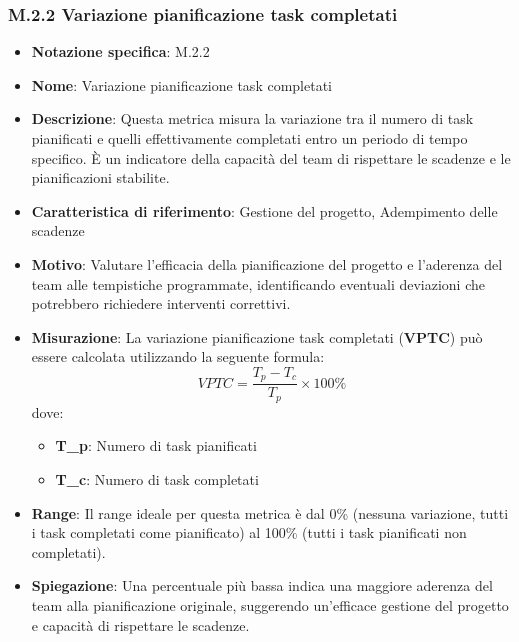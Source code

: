 \subsubsection{M.2.2 Variazione pianificazione task completati}
\begin{itemize}
    \item \textbf{Notazione specifica}: M.2.2
    \item \textbf{Nome}: Variazione pianificazione task completati
    \item \textbf{Descrizione}: Questa metrica misura la variazione tra il numero di task pianificati e quelli effettivamente completati entro un periodo di tempo specifico. È un indicatore della capacità del team di rispettare le scadenze e le pianificazioni stabilite.
    \item \textbf{Caratteristica di riferimento}: Gestione del progetto, Adempimento delle scadenze
    \item \textbf{Motivo}: Valutare l'efficacia della pianificazione del progetto e l'aderenza del team alle tempistiche programmate, identificando eventuali deviazioni che potrebbero richiedere interventi correttivi.
    \item \textbf{Misurazione}: La variazione pianificazione task completati (\textbf{VPTC}) può essere calcolata utilizzando la seguente formula:
    \[ VPTC = \frac{T_p - T_c}{T_p} \times 100\% \]
    dove:
    \begin{itemize}
        \item \textbf{T_p}: Numero di task pianificati
        \item \textbf{T_c}: Numero di task completati
    \end{itemize}
    \item \textbf{Range}: Il range ideale per questa metrica è dal 0\% (nessuna variazione, tutti i task completati come pianificato) al 100\% (tutti i task pianificati non completati).
    \item \textbf{Spiegazione}: Una percentuale più bassa indica una maggiore aderenza del team alla pianificazione originale, suggerendo un'efficace gestione del progetto e capacità di rispettare le scadenze.
\end{itemize}
